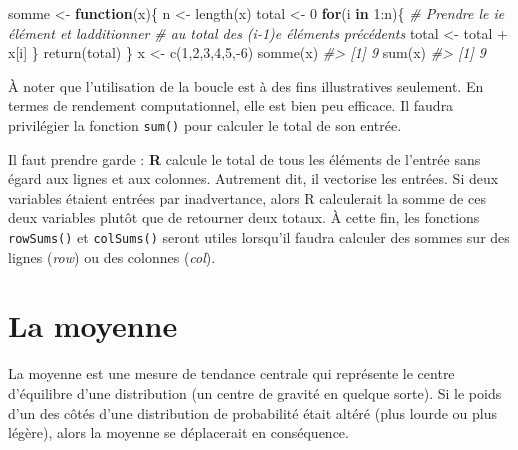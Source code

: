 \documentclass[
]{book}
\newenvironment{Shaded}{}{}
\newcommand{\CommentTok}[1]{\textit{#1}}
\newcommand{\ControlFlowTok}[1]{\textbf{#1}}
\newcommand{\DecValTok}[1]{#1}
\newcommand{\FunctionTok}[1]{#1}
\newcommand{\NormalTok}[1]{#1}
\newcommand{\OtherTok}[1]{#1}
\newcommand{\SpecialCharTok}[1]{#1}
\begin{document}
\begin{Shaded}
\begin{Highlighting}[]
\NormalTok{somme }\OtherTok{\textless{}{-}} \ControlFlowTok{function}\NormalTok{(x)\{}
\NormalTok{  n }\OtherTok{\textless{}{-}} \FunctionTok{length}\NormalTok{(x)}
\NormalTok{  total }\OtherTok{\textless{}{-}} \DecValTok{0}
  \ControlFlowTok{for}\NormalTok{(i }\ControlFlowTok{in} \DecValTok{1}\SpecialCharTok{:}\NormalTok{n)\{}
    \CommentTok{\# Prendre le ie élément et l\textquotesingle{}additionner}
    \CommentTok{\# au total des (i{-}1)e éléments précédents}
\NormalTok{    total }\OtherTok{\textless{}{-}}\NormalTok{ total }\SpecialCharTok{+}\NormalTok{ x[i]}
\NormalTok{  \}}
  \FunctionTok{return}\NormalTok{(total)}
\NormalTok{\}}
\NormalTok{x }\OtherTok{\textless{}{-}} \FunctionTok{c}\NormalTok{(}\DecValTok{1}\NormalTok{,}\DecValTok{2}\NormalTok{,}\DecValTok{3}\NormalTok{,}\DecValTok{4}\NormalTok{,}\DecValTok{5}\NormalTok{,}\SpecialCharTok{{-}}\DecValTok{6}\NormalTok{)}
\FunctionTok{somme}\NormalTok{(x)}
\CommentTok{\#\textgreater{} [1] 9}
\FunctionTok{sum}\NormalTok{(x)}
\CommentTok{\#\textgreater{} [1] 9}
\end{Highlighting}
\end{Shaded}

À noter que l'utilisation de la boucle est à des fins illustratives seulement. En termes de rendement computationnel, elle est bien peu efficace. Il faudra privilégier la fonction \texttt{sum()} pour calculer le total de son entrée.

Il faut prendre garde : \textbf{R} calcule le total de tous les éléments de l'entrée sans égard aux lignes et aux colonnes. Autrement dit, il vectorise les entrées. Si deux variables étaient entrées par inadvertance, alors R calculerait la somme de ces deux variables plutôt que de retourner deux totaux. À cette fin, les fonctions \texttt{rowSums()} et \texttt{colSums()} seront utiles lorsqu'il faudra calculer des sommes sur des lignes (\emph{row}) ou des colonnes (\emph{col}).

\hypertarget{la-moyenne}{%
\section{La moyenne}\label{la-moyenne}}

La moyenne est une mesure de tendance centrale qui représente le centre d'équilibre d'une distribution (un centre de gravité en quelque sorte). Si le poids d'un des côtés d'une distribution de probabilité était altéré (plus lourde ou plus légère), alors la moyenne se déplacerait en conséquence.
\end{document}
